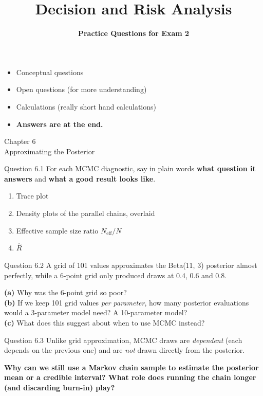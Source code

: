 \documentclass[aspectratio=43,11pt]{beamer}
\title{Decision and Risk Analysis}
\subtitle{\textbf{Practice Questions for Exam 2}}
\author{}
\date{
\color{aggiemaroon}{
DAEN 427 / ISEN 427 / ISEN 627 - Fall 2026\\
\textbf{Alexander Abuabara}
}
}
\newcommand{\divider}[2]{%
  \begin{frame}
    \centering
    {\Large #1}\\[0.6em]
    {\normalsize #2}
  \end{frame}}
\begin{document}
\begin{frame}
  \titlepage
\end{frame}

\begin{frame}{}
  \begin{itemize}
  \item Conceptual questions
  \item Open questions (for more understanding)
  \item Calculations (really short hand calculations)
  \item \textbf{Answers are at the end.}
  \end{itemize}
\end{frame}

\divider{Chapter 6}{Approximating the Posterior}

\begin{frame}{Question 6.1}
  For each MCMC diagnostic, say in plain words \textbf{what question it
  answers} and \textbf{what a good result looks like}.
  \vspace{0.6em}
  \begin{enumerate}
    \item Trace plot
    \item Density plots of the parallel chains, overlaid
    \item Effective sample size ratio $N_{\text{eff}}/N$
    \item $\hat R$
  \end{enumerate}
\end{frame}

\begin{frame}{Question 6.2}
  A grid of 101 values approximates the Beta(11, 3) posterior almost
  perfectly, while a 6-point grid only produced draws at 0.4, 0.6 and 0.8.
  \vspace{0.6em}

  \textbf{(a)} Why was the 6-point grid so poor? \\[0.3em]
  \textbf{(b)} If we keep 101 grid values \emph{per parameter}, how many
  posterior evaluations would a 3-parameter model need? A 10-parameter
  model? \\[0.3em]
  \textbf{(c)} What does this suggest about when to use MCMC instead?
\end{frame}

\begin{frame}{Question 6.3}
  Unlike grid approximation, MCMC draws are \emph{dependent}
  (each depends on the previous one) and are \emph{not} drawn directly
  from the posterior.
  \vspace{0.6em}

  \textbf{Why can we still use a Markov chain sample to estimate the
  posterior mean or a credible interval? What role does running the
  chain longer (and discarding burn-in) play?}
\end{frame}
\end{document}
